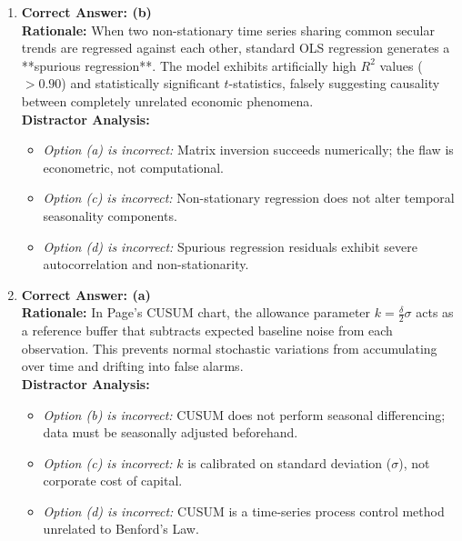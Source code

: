 \begin{enumerate}[label=\textbf{MCQ 10.\arabic*}]
    \item \textbf{Correct Answer: (b)}\\
    \textbf{Rationale:} When two non-stationary time series sharing common secular trends are regressed against each other, standard OLS regression generates a **spurious regression**. The model exhibits artificially high $R^2$ values ($> 0.90$) and statistically significant $t$-statistics, falsely suggesting causality between completely unrelated economic phenomena.\\
    \textbf{Distractor Analysis:}
    \begin{itemize}
        \item \textit{Option (a) is incorrect:} Matrix inversion succeeds numerically; the flaw is econometric, not computational.
        \item \textit{Option (c) is incorrect:} Non-stationary regression does not alter temporal seasonality components.
        \item \textit{Option (d) is incorrect:} Spurious regression residuals exhibit severe autocorrelation and non-stationarity.
    \end{itemize}

    \item \textbf{Correct Answer: (a)}\\
    \textbf{Rationale:} In Page's CUSUM chart, the allowance parameter $k = \frac{\delta}{2} \sigma$ acts as a reference buffer that subtracts expected baseline noise from each observation. This prevents normal stochastic variations from accumulating over time and drifting into false alarms.\\
    \textbf{Distractor Analysis:}
    \begin{itemize}
        \item \textit{Option (b) is incorrect:} CUSUM does not perform seasonal differencing; data must be seasonally adjusted beforehand.
        \item \textit{Option (c) is incorrect:} $k$ is calibrated on standard deviation ($\sigma$), not corporate cost of capital.
        \item \textit{Option (d) is incorrect:} CUSUM is a time-series process control method unrelated to Benford's Law.
    \end{itemize}
\end{enumerate}

\newpage
